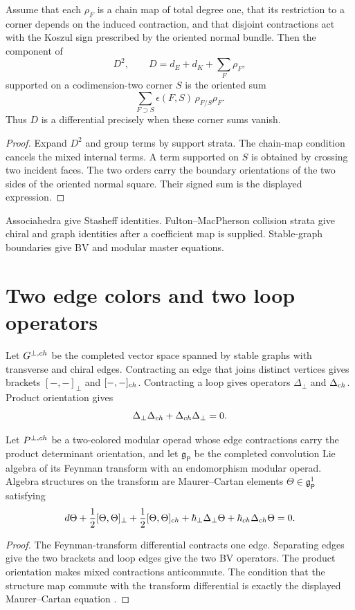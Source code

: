 \begin{theorem}
Assume that each $\rho_F$ is a chain map of total degree one, that its restriction to a corner depends on the induced contraction, and that disjoint contractions act with the Koszul sign prescribed by the oriented normal bundle. Then the component of
\[
 D^2,\qquad D=d_E+d_K+\sum_F\rho_F,
\]
supported on a codimension-two corner $S$ is the oriented sum
\[
 \sum_{F\supset S}\epsilon(F,S)\,\rho_{F/S}\rho_F.
\]
Thus $D$ is a differential precisely when these corner sums vanish.
\end{theorem}
\begin{proof}
Expand $D^2$ and group terms by support strata. The chain-map condition cancels the mixed internal terms. A term supported on $S$ is obtained by crossing two incident faces. The two orders carry the boundary orientations of the two sides of the oriented normal square. Their signed sum is the displayed expression.
\end{proof}

Associahedra give Stasheff identities. Fulton--MacPherson collision strata give chiral and graph identities after a coefficient map is supplied. Stable-graph boundaries give BV and modular master equations.

\chapter{Two edge colors and two loop operators}
Let $G^{\perp,ch}$ be the completed vector space spanned by stable graphs with transverse and chiral edges. Contracting an edge that joins distinct vertices gives brackets $[-,-]_\perp$ and $[-,-]_{ch}$. Contracting a loop gives operators $\Delta_\perp$ and $\Delta_{ch}$. Product orientation gives
\[
 \Delta_\perp\Delta_{ch}+\Delta_{ch}\Delta_\perp=0.
\]

\begin{theorem}
Let $P^{\perp,ch}$ be a two-colored modular operad whose edge contractions carry the product determinant orientation, and let $\mathfrak g_{\mathsf P}$ be the completed convolution Lie algebra of its Feynman transform with an endomorphism modular operad. Algebra structures on the transform are Maurer--Cartan elements $\Theta\in\mathfrak g_{\mathsf P}^1$ satisfying
\[
 d\Theta+\frac12[\Theta,\Theta]_\perp
 +\frac12[\Theta,\Theta]_{ch}
 +\hbar_\perp\Delta_\perp\Theta
 +\hbar_{ch}\Delta_{ch}\Theta=0.
\]
\end{theorem}
\begin{proof}
The Feynman-transform differential contracts one edge. Separating edges give the two brackets and loop edges give the two BV operators. The product orientation makes mixed contractions anticommute. The condition that the structure map commute with the transform differential is exactly the displayed Maurer--Cartan equation \cite{GetzlerKapranov}.
\end{proof}

